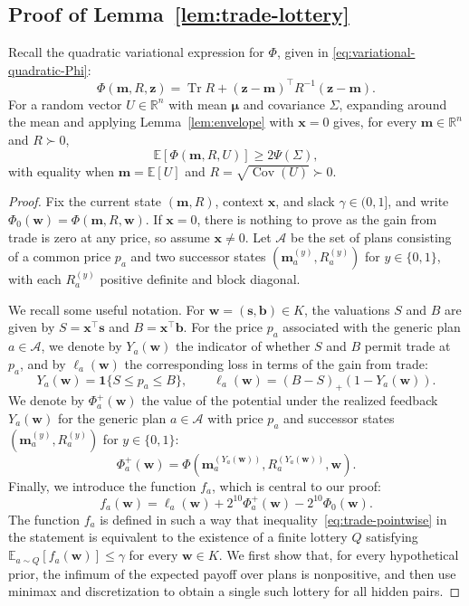 \documentclass[11pt]{article}
\newcommand{\E}[1]{\mathbb E\left[#1\right]}
\newcommand{\Esub}[2]{\mathbb E_{#1}\left[#2\right]}
\newcommand{\R}{\mathbb R}
\DeclareMathOperator{\Cov}{Cov}
\DeclareMathOperator{\Tr}{Tr}
\newcommand{\bmu}{\boldsymbol\mu}
\newcommand{\bm}{\boldsymbol m}
\newcommand{\bx}{\boldsymbol x}
\newcommand{\bz}{\boldsymbol z}
\begin{document}
\subsection{Proof of Lemma~\ref{lem:trade-lottery}}\label{sec:trade-lottery-proof}

Recall {the quadratic variational expression for} $\Phi$, {given in} \eqref{eq:variational-quadratic-Phi}:
\[
    \Phi(\bm,R,\bz) = \Tr R+(\bz-\bm)^\top R^{-1}(\bz-\bm).
\]
For a random vector $U\in\R^n$ with mean $\bmu$ and covariance $\Sigma$, expanding around the mean and applying Lemma~\ref{lem:envelope} with $\bx=0$ gives, for every $\bm\in\R^n$ and $R\succ0$,
\[
 \E{\Phi(\bm,R,U)}
 \ge2\Psi(\Sigma),
\]
with equality when $\bm = \E{U}$ and $R =\sqrt{\Cov(U)}\succ 0$.


\tradelottery*

\begin{proof}
Fix the current state $(\bm,R)$, context $\bx$, and slack $\gamma\in(0,1]$, and write $\Phi_0(\boldsymbol w)=\Phi(\bm,R,\boldsymbol w)$. If $\bx=0$, there is nothing to prove as the gain from trade is zero at any price, so assume $\bx\ne0$. Let $\mathcal A$ be the set of plans consisting of a common price $p_a$ and two successor states $(\bm_a^{(y)},R_a^{(y)})$ for $y\in\{0,1\}$, with each $R_a^{(y)}$ positive definite and block diagonal.

We recall some useful notation. For $\boldsymbol w=(\boldsymbol s,\boldsymbol b)\in K$, the valuations $S$ and $B$ {are given by $S=\bx^\top\boldsymbol s$ and $B=\bx^\top\boldsymbol b$}. For the price $p_a$ associated with the generic plan $a \in \mathcal A$, we {denote by} $Y_a(\boldsymbol w)$ the indicator of whether $S$ and $B$ {permit trade at} $p_a$, and {by} $\ell_a(\boldsymbol w)$ the corresponding loss {in terms of} the gain from trade:
\[
     Y_a(\boldsymbol w)=\mathbf1\{S\le p_a\le B\},\qquad
 \ell_a(\boldsymbol w)=(B-S)_+(1-Y_a(\boldsymbol w)).
\]
We {denote by} $\Phi_a^+(\boldsymbol w)$ the value of the potential under the realized feedback $Y_a(\boldsymbol w)$ for the generic plan $a \in \mathcal A$ with price $p_a$ and successor states $(\bm_a^{(y)},R_a^{(y)})$ for $y\in\{0,1\}$:
\[
    \Phi_a^+(\boldsymbol w)=\Phi(\bm_a^{(Y_a(\boldsymbol w))},R_a^{(Y_a(\boldsymbol w))},\boldsymbol w).    
\]
Finally, we introduce the function $f_a${, which is central to our proof}:
\[
 f_a(\boldsymbol w)=\ell_a(\boldsymbol w)+2^{10}\Phi_a^+(\boldsymbol w)
                         -2^{10}\Phi_0(\boldsymbol w).
\]
The function $f_a$ is defined in such a way that inequality~\eqref{eq:trade-pointwise} in the statement is {equivalent to the existence of} a finite lottery $Q$ satisfying $\Esub{a\sim Q}{f_a(\boldsymbol w)}\le\gamma$ for every $\boldsymbol w\in K$. 
% 
We first show that, for every hypothetical prior, the {infimum of the expected payoff over plans} is nonpositive, {and then} use minimax and discretization to obtain a single such lottery for all hidden pairs.


\end{proof}
\end{document}
